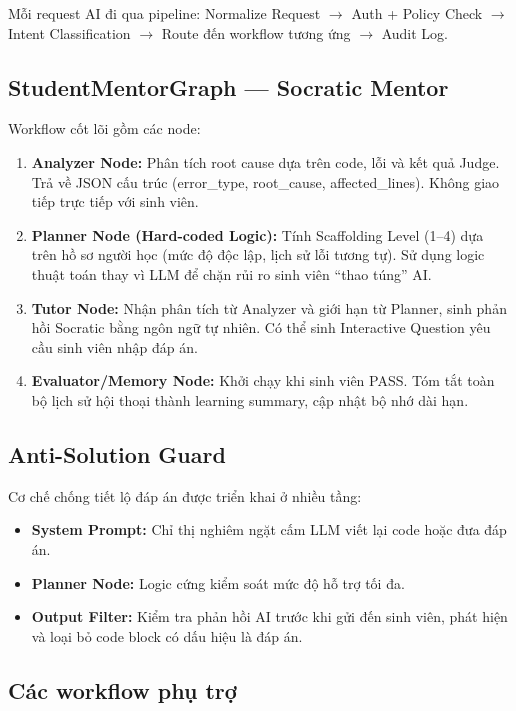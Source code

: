 Mỗi request AI đi qua pipeline: Normalize Request $\rightarrow$ Auth + Policy Check $\rightarrow$ Intent Classification $\rightarrow$ Route đến workflow tương ứng $\rightarrow$ Audit Log.

\subsection{StudentMentorGraph --- Socratic Mentor}

Workflow cốt lõi gồm các node:

\begin{enumerate}
    \item \textbf{Analyzer Node:} Phân tích root cause dựa trên code, lỗi và kết quả Judge. Trả về JSON cấu trúc (error\_type, root\_cause, affected\_lines). Không giao tiếp trực tiếp với sinh viên.
    \item \textbf{Planner Node (Hard-coded Logic):} Tính Scaffolding Level (1--4) dựa trên hồ sơ người học (mức độ độc lập, lịch sử lỗi tương tự). Sử dụng logic thuật toán thay vì LLM để chặn rủi ro sinh viên ``thao túng'' AI.
    \item \textbf{Tutor Node:} Nhận phân tích từ Analyzer và giới hạn từ Planner, sinh phản hồi Socratic bằng ngôn ngữ tự nhiên. Có thể sinh Interactive Question yêu cầu sinh viên nhập đáp án.
    \item \textbf{Evaluator/Memory Node:} Khởi chạy khi sinh viên PASS. Tóm tắt toàn bộ lịch sử hội thoại thành learning summary, cập nhật bộ nhớ dài hạn.
\end{enumerate}

\subsection{Anti-Solution Guard}

Cơ chế chống tiết lộ đáp án được triển khai ở nhiều tầng:
\begin{itemize}
    \item \textbf{System Prompt:} Chỉ thị nghiêm ngặt cấm LLM viết lại code hoặc đưa đáp án.
    \item \textbf{Planner Node:} Logic cứng kiểm soát mức độ hỗ trợ tối đa.
    \item \textbf{Output Filter:} Kiểm tra phản hồi AI trước khi gửi đến sinh viên, phát hiện và loại bỏ code block có dấu hiệu là đáp án.
\end{itemize}

\subsection{Các workflow phụ trợ}

